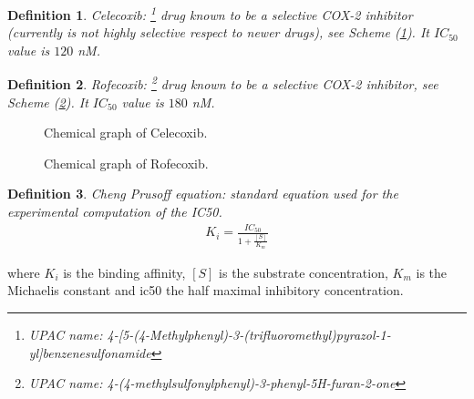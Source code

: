 \documentclass[11pt]{article}
\newtheorem{definition}{Definition}
\begin{document}
\begin{definition}\label{definitionCelecoxib}
Celecoxib: \footnote{UPAC name: 4-[5-(4-Methylphenyl)-3-(trifluoromethyl)pyrazol-1-yl]benzenesulfonamide} drug known to be a selective COX-2 inhibitor (currently is not \emph{highly selective} respect to newer drugs), see Scheme (\ref{CelecoxibFigure}). It $IC_{50}$ value is $120$ nM.
\end{definition}

\begin{definition}\label{definitionRofecoxib}
Rofecoxib: \footnote{UPAC name: 4-(4-methylsulfonylphenyl)-3-phenyl-5H-furan-2-one} drug known to be a selective COX-2 inhibitor, see Scheme (\ref{RofecoxibFigure}). It $IC_{50}$ value is $180$ nM.
\end{definition}

\begin{figure}[H]
\captionsetup{type=scheme}
\centering
{}
\caption{Chemical graph of Celecoxib.}
\label{CelecoxibFigure}
\end{figure}

\begin{figure}[H]
\captionsetup{type=scheme}
\centering
{}
\caption{Chemical graph of Rofecoxib.}
\label{RofecoxibFigure}
\end{figure}
\begin{definition}\label{definitionChengPrusoff}
Cheng Prusoff equation: standard equation used for the experimental computation of the IC50.
	\begin{align*}
		K_i=\frac{IC_{50}}{1+\frac{[S]}{K_m}}
	\end{align*}
\end{definition}
where $K_i$ is the binding affinity, $[S]$ is the substrate concentration, $K_m$ is the Michaelis constant and \gls{ic50} the half maximal inhibitory concentration.
\end{document}
